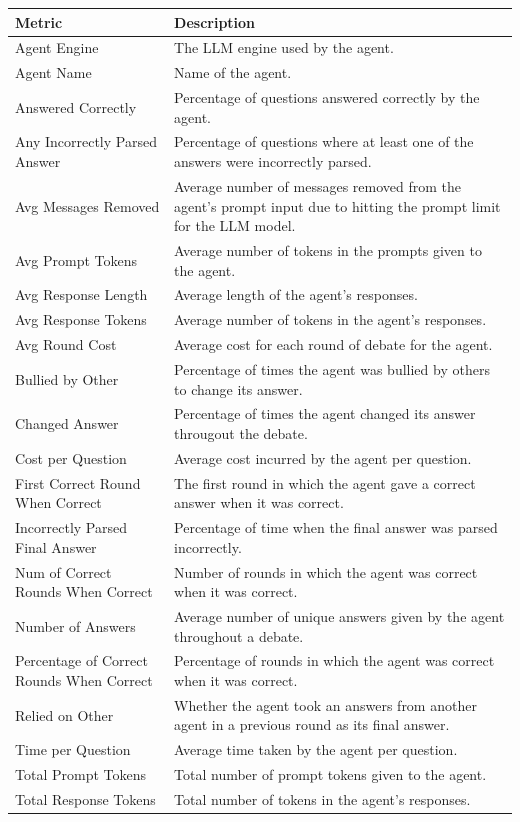 \begin{tabularx}{\textwidth}{lX}
    \hline
    \textbf{Metric} & \textbf{Description} \\
    \hline
    Agent Engine & The LLM engine used by the agent. \\
    Agent Name & Name of the agent. \\
    Answered Correctly & Percentage of questions answered correctly by the agent. \\
    Any Incorrectly Parsed Answer & Percentage of questions where at least one of the answers were incorrectly parsed. \\
    Avg Messages Removed & Average number of messages removed from the agent's prompt input due to hitting the prompt limit for the LLM model. \\
    Avg Prompt Tokens & Average number of tokens in the prompts given to the agent. \\
    Avg Response Length & Average length of the agent's responses. \\
    Avg Response Tokens & Average number of tokens in the agent's responses. \\
    Avg Round Cost & Average cost for each round of debate for the agent. \\
    Bullied by Other & Percentage of times the agent was bullied by others to change its answer. \\
    Changed Answer & Percentage of times the agent changed its answer througout the debate. \\
    Cost per Question & Average cost incurred by the agent per question. \\
    First Correct Round When Correct & The first round in which the agent gave a correct answer when it was correct. \\
    Incorrectly Parsed Final Answer & Percentage of time when the final answer was parsed incorrectly. \\
    Num of Correct Rounds When Correct & Number of rounds in which the agent was correct when it was correct. \\
    Number of Answers & Average number of unique answers given by the agent throughout a debate. \\
    Percentage of Correct Rounds When Correct & Percentage of rounds in which the agent was correct when it was correct. \\
    Relied on Other & Whether the agent took an answers from another agent in a previous round as its final answer. \\
    Time per Question & Average time taken by the agent per question. \\
    Total Prompt Tokens & Total number of prompt tokens given to the agent. \\
    Total Response Tokens & Total number of tokens in the agent's responses. \\
\end{tabularx}

